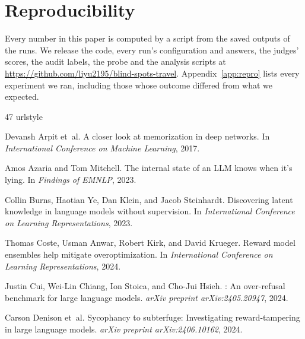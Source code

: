 \documentclass[11pt,a4paper,twocolumn]{article}
\begin{document}
\section*{Reproducibility}

Every number in this paper is computed by a script from the saved outputs of the runs. We release the code, every run's configuration and answers, the judges' scores, the audit labels, the probe and the analysis scripts at \url{https://github.com/liyu2195/blind-spots-travel}. Appendix~\ref{app:repro} lists every experiment we ran, including those whose outcome differed from what we expected.

\begin{thebibliography}{47}
\providecommand{\natexlab}[1]{#1}
\providecommand{\url}[1]{\texttt{#1}}
\expandafter\ifx\csname urlstyle\endcsname\relax
  \providecommand{\doi}[1]{doi: #1}\else
  \providecommand{\doi}{doi: \begingroup \urlstyle{rm}\Url}\fi

Devansh Arpit et~al.
\newblock A closer look at memorization in deep networks.
\newblock In \emph{International Conference on Machine Learning}, 2017.

Amos Azaria and Tom Mitchell.
\newblock The internal state of an {LLM} knows when it's lying.
\newblock In \emph{Findings of EMNLP}, 2023.

Collin Burns, Haotian Ye, Dan Klein, and Jacob Steinhardt.
\newblock Discovering latent knowledge in language models without supervision.
\newblock In \emph{International Conference on Learning Representations}, 2023.

Thomas Coste, Usman Anwar, Robert Kirk, and David Krueger.
\newblock Reward model ensembles help mitigate overoptimization.
\newblock In \emph{International Conference on Learning Representations}, 2024.

Justin Cui, Wei-Lin Chiang, Ion Stoica, and Cho-Jui Hsieh.
: An over-refusal benchmark for large language models.
\newblock \emph{arXiv preprint arXiv:2405.20947}, 2024.

Carson Denison et~al.
\newblock Sycophancy to subterfuge: Investigating reward-tampering in large
  language models.
\newblock \emph{arXiv preprint arXiv:2406.10162}, 2024.


\end{thebibliography}
\end{document}
